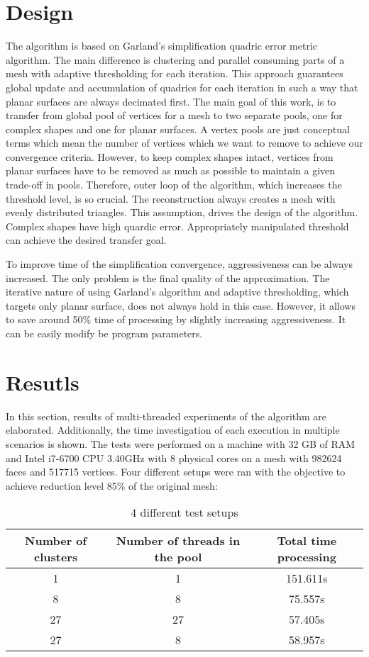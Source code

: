 \newpage
\section{Design}

The algorithm is based on Garland's simplification quadric error metric algorithm. The main difference is clustering and parallel consuming parts of a mesh with adaptive thresholding for each iteration. This approach guarantees global update and accumulation of quadrics for each iteration in such a way that planar surfaces are always decimated first. The main goal of this work, is to transfer from global pool of vertices for a mesh to two separate pools, one for complex shapes and one for planar surfaces. A vertex pools are just conceptual terms which mean the number of vertices which we want to remove to achieve our convergence criteria. However, to keep complex shapes intact, vertices from planar surfaces have to be removed as much as possible to maintain a given trade-off in pools. Therefore, outer loop of the algorithm, which increases the threshold level, is so crucial. The reconstruction always creates a mesh with evenly distributed triangles. This assumption, drives the design of the algorithm. Complex shapes have high quardic error. Appropriately manipulated threshold can achieve the desired transfer goal.

To improve time of the simplification convergence, aggressiveness can be always increased. The only problem is the final quality of the approximation. The iterative nature of using Garland's algorithm and adaptive thresholding, which targets only planar surface, does not always hold in this case. However, it allows to save around 50\% time of processing by slightly increasing aggressiveness. It can be easily modify be program parameters.

\newpage
\section{Resutls}

In this section, results of multi-threaded experiments of the algorithm are elaborated. Additionally, the time investigation of each execution in multiple scenarios is shown. The tests were performed on a machine with 32 GB of RAM and Intel i7-6700 CPU 3.40GHz with 8 physical cores on a mesh with 982624 faces and 517715 vertices. Four different setups were ran with the objective to achieve reduction level 85\% of the original mesh:

\begin{table}[h!]
\centering
\begin{tabular}{ |c|c|c| } 
 \hline
 Number of clusters & Number of threads in the pool & Total time processing\\
 \hline
 1 & 1 & 151.611s\\ 
 8 & 8 & 75.557s\\ 
 27 & 27 & 57.405s\\
 27 & 8 & 58.957s\\
 \hline
\end{tabular}
\caption{4 different test setups}
\end{table}

